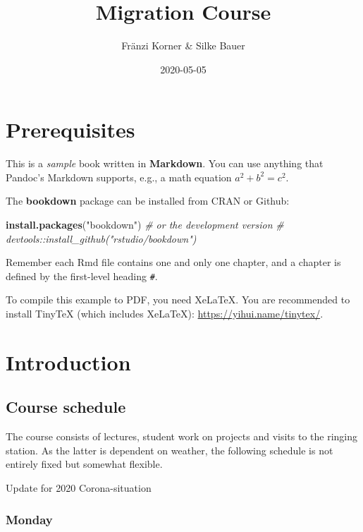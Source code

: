 \documentclass[
]{book}
\title{Migration Course}
\author{Fränzi Korner \& Silke Bauer}
\date{2020-05-05}
\newenvironment{Shaded}{\begin{snugshade}}{\end{snugshade}}
\newcommand{\CommentTok}[1]{\textcolor[rgb]{0.56,0.35,0.01}{\textit{#1}}}
\newcommand{\KeywordTok}[1]{\textcolor[rgb]{0.13,0.29,0.53}{\textbf{#1}}}
\newcommand{\NormalTok}[1]{#1}
\newcommand{\StringTok}[1]{\textcolor[rgb]{0.31,0.60,0.02}{#1}}
\begin{document}
\maketitle

{
\setcounter{tocdepth}{1}
\tableofcontents
}
\hypertarget{prerequisites}{%
\chapter{Prerequisites}\label{prerequisites}}

This is a \emph{sample} book written in \textbf{Markdown}. You can use anything that Pandoc's Markdown supports, e.g., a math equation \(a^2 + b^2 = c^2\).

The \textbf{bookdown} package can be installed from CRAN or Github:

\begin{Shaded}
\begin{Highlighting}[]
\KeywordTok{install.packages}\NormalTok{(}\StringTok{"bookdown"}\NormalTok{)}
\CommentTok{# or the development version}
\CommentTok{# devtools::install_github("rstudio/bookdown")}
\end{Highlighting}
\end{Shaded}

Remember each Rmd file contains one and only one chapter, and a chapter is defined by the first-level heading \texttt{\#}.

To compile this example to PDF, you need XeLaTeX. You are recommended to install TinyTeX (which includes XeLaTeX): \url{https://yihui.name/tinytex/}.

\hypertarget{introduction}{%
\chapter{Introduction}\label{introduction}}

\hypertarget{course-schedule}{%
\section{Course schedule}\label{course-schedule}}

The course consists of lectures, student work on projects and visits to the ringing station. As the latter is dependent on weather, the following schedule is not entirely fixed but somewhat flexible.

Update for 2020 Corona-situation

\hypertarget{monday}{%
\subsection{Monday}\label{monday}}
\end{document}
